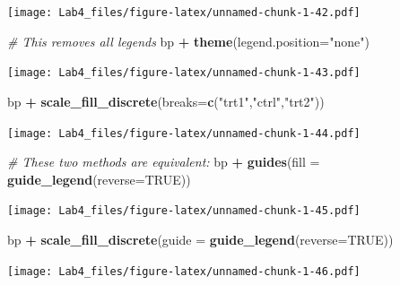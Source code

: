 \documentclass[]{article}
\newenvironment{Shaded}{\begin{snugshade}}{\end{snugshade}}
\newcommand{\KeywordTok}[1]{\textcolor[rgb]{0.13,0.29,0.53}{\textbf{#1}}}
\newcommand{\DataTypeTok}[1]{\textcolor[rgb]{0.13,0.29,0.53}{#1}}
\newcommand{\StringTok}[1]{\textcolor[rgb]{0.31,0.60,0.02}{#1}}
\newcommand{\CommentTok}[1]{\textcolor[rgb]{0.56,0.35,0.01}{\textit{#1}}}
\newcommand{\OtherTok}[1]{\textcolor[rgb]{0.56,0.35,0.01}{#1}}
\newcommand{\OperatorTok}[1]{\textcolor[rgb]{0.81,0.36,0.00}{\textbf{#1}}}
\newcommand{\NormalTok}[1]{#1}
\begin{document}
\texttt{[image: Lab4\_files/figure-latex/unnamed-chunk-1-42.pdf]}

\begin{Shaded}
\begin{Highlighting}[]
\CommentTok{# This removes all legends}
\NormalTok{bp }\OperatorTok{+}\StringTok{ }\KeywordTok{theme}\NormalTok{(}\DataTypeTok{legend.position=}\StringTok{"none"}\NormalTok{)}
\end{Highlighting}
\end{Shaded}

\texttt{[image: Lab4\_files/figure-latex/unnamed-chunk-1-43.pdf]}

\begin{Shaded}
\begin{Highlighting}[]
\NormalTok{bp }\OperatorTok{+}\StringTok{ }\KeywordTok{scale_fill_discrete}\NormalTok{(}\DataTypeTok{breaks=}\KeywordTok{c}\NormalTok{(}\StringTok{"trt1"}\NormalTok{,}\StringTok{"ctrl"}\NormalTok{,}\StringTok{"trt2"}\NormalTok{))}
\end{Highlighting}
\end{Shaded}

\texttt{[image: Lab4\_files/figure-latex/unnamed-chunk-1-44.pdf]}

\begin{Shaded}
\begin{Highlighting}[]
\CommentTok{# These two methods are equivalent:}
\NormalTok{bp }\OperatorTok{+}\StringTok{ }\KeywordTok{guides}\NormalTok{(}\DataTypeTok{fill =} \KeywordTok{guide_legend}\NormalTok{(}\DataTypeTok{reverse=}\OtherTok{TRUE}\NormalTok{))}
\end{Highlighting}
\end{Shaded}

\texttt{[image: Lab4\_files/figure-latex/unnamed-chunk-1-45.pdf]}

\begin{Shaded}
\begin{Highlighting}[]
\NormalTok{bp }\OperatorTok{+}\StringTok{ }\KeywordTok{scale_fill_discrete}\NormalTok{(}\DataTypeTok{guide =} \KeywordTok{guide_legend}\NormalTok{(}\DataTypeTok{reverse=}\OtherTok{TRUE}\NormalTok{))}
\end{Highlighting}
\end{Shaded}

\texttt{[image: Lab4\_files/figure-latex/unnamed-chunk-1-46.pdf]}

\begin{Shaded}
\end{Shaded}
\end{document}
